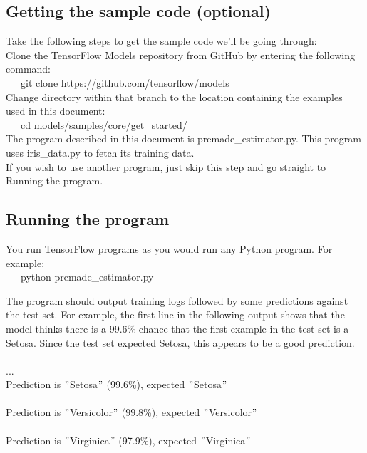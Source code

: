 \documentclass[a4paper,10pt]{report}
\begin{document}
 \subsection{Getting the sample code (optional)}
 Take the following steps to get the sample code we'll be going through:\\
 

    Clone the TensorFlow Models repository from GitHub by entering the following command:\\

    \-\ \-\ \-\ git clone https://github.com/tensorflow/models\\

    Change directory within that branch to the location containing the examples used in this document:\\

    \-\ \-\ \-\ cd models/samples/core/get\_started/\\

The program described in this document is premade\_estimator.py. This program uses iris\_data.py to fetch its training data.\\
If you wish to use another program, just skip this step and go straight to Running the program.

\subsection{Running the program}
You run TensorFlow programs as you would run any Python program. For example:\\

\-\ \-\ \-\ python premade\_estimator.py

The program should output training logs followed by some predictions against the test set. For example, the first line in the following output
shows that the model thinks there is a 99.6\% chance that the first example in the test set is a Setosa. Since the test set expected Setosa, 
this appears to be a good prediction.\\
\\
...\\
Prediction is $"$Setosa$"$ (99.6\%), expected $"$Setosa$"$\\
\\
Prediction is $"$Versicolor$"$ (99.8\%), expected $"$Versicolor$"$\\
\\
Prediction is $"$Virginica$"$ (97.9\%), expected $"$Virginica$"$\\
\end{document}
